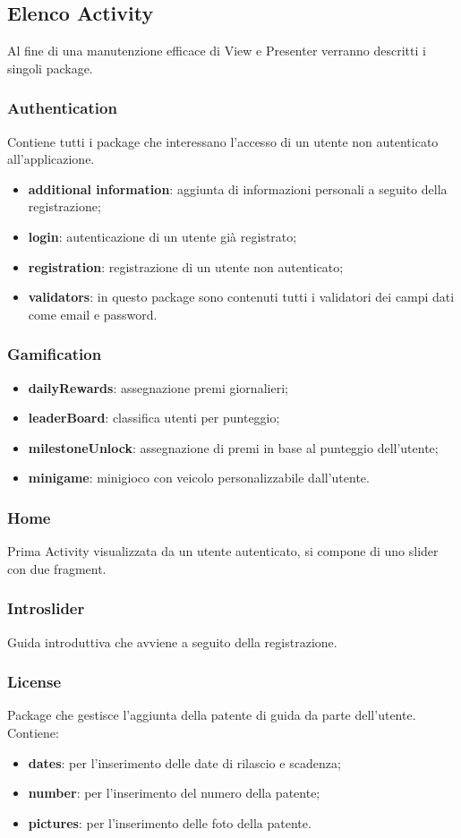 \newpage

\subsection{Elenco Activity}
Al fine di una manutenzione efficace di View e Presenter verranno descritti i singoli package.

\subsubsection{Authentication}
Contiene tutti i package che interessano l'accesso di un utente non autenticato all'applicazione.
\begin{itemize}
	\item \textbf{additional information}: aggiunta di informazioni personali a seguito della registrazione;
	\item \textbf{login}: autenticazione di un utente già registrato;
	\item \textbf{registration}: registrazione di un utente non autenticato;
	\item \textbf{validators}: in questo package sono contenuti tutti i validatori dei campi dati come email e password.	
\end{itemize}
\subsubsection{Gamification}
\begin{itemize}
	\item \textbf{dailyRewards}: assegnazione premi giornalieri;
	\item \textbf{leaderBoard}: classifica utenti per punteggio;
	\item \textbf{milestoneUnlock}: assegnazione di premi in base al punteggio dell'utente;
	\item \textbf{minigame}: minigioco con veicolo personalizzabile dall'utente.
\end{itemize}
\subsubsection{Home}
Prima Activity visualizzata da un utente autenticato, si compone di uno slider con due fragment\glo.
\subsubsection{Introslider}
Guida introduttiva che avviene a seguito della registrazione.
\subsubsection{License}
Package che gestisce l'aggiunta della patente di guida da parte dell'utente.
Contiene:
\begin{itemize}
	\item \textbf{dates}: per l'inserimento delle date di rilascio e scadenza;
	\item \textbf{number}: per l'inserimento del numero della patente;
	\item \textbf{pictures}: per l'inserimento delle foto della patente.
\end{itemize}
